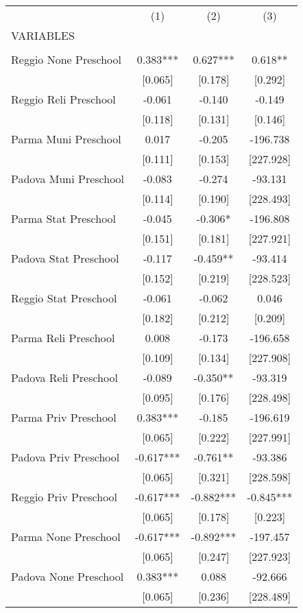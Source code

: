 \begin{tabular}{lccc} \hline
 & (1) & (2) & (3) \\
VARIABLES &  &  &  \\ \hline
 &  &  &  \\
Reggio None Preschool & 0.383*** & 0.627*** & 0.618** \\
 & [0.065] & [0.178] & [0.292] \\
Reggio Reli Preschool & -0.061 & -0.140 & -0.149 \\
 & [0.118] & [0.131] & [0.146] \\
Parma Muni Preschool & 0.017 & -0.205 & -196.738 \\
 & [0.111] & [0.153] & [227.928] \\
Padova Muni Preschool & -0.083 & -0.274 & -93.131 \\
 & [0.114] & [0.190] & [228.493] \\
Parma Stat Preschool & -0.045 & -0.306* & -196.808 \\
 & [0.151] & [0.181] & [227.921] \\
Padova Stat Preschool & -0.117 & -0.459** & -93.414 \\
 & [0.152] & [0.219] & [228.523] \\
Reggio Stat Preschool & -0.061 & -0.062 & 0.046 \\
 & [0.182] & [0.212] & [0.209] \\
Parma Reli Preschool & 0.008 & -0.173 & -196.658 \\
 & [0.109] & [0.134] & [227.908] \\
Padova Reli Preschool & -0.089 & -0.350** & -93.319 \\
 & [0.095] & [0.176] & [228.498] \\
Parma Priv Preschool & 0.383*** & -0.185 & -196.619 \\
 & [0.065] & [0.222] & [227.991] \\
Padova Priv Preschool & -0.617*** & -0.761** & -93.386 \\
 & [0.065] & [0.321] & [228.598] \\
Reggio Priv Preschool & -0.617*** & -0.882*** & -0.845*** \\
 & [0.065] & [0.178] & [0.223] \\
Parma None Preschool & -0.617*** & -0.892*** & -197.457 \\
 & [0.065] & [0.247] & [227.923] \\
Padova None Preschool & 0.383*** & 0.088 & -92.666 \\
 & [0.065] & [0.236] & [228.489] \\

\end{tabular}
